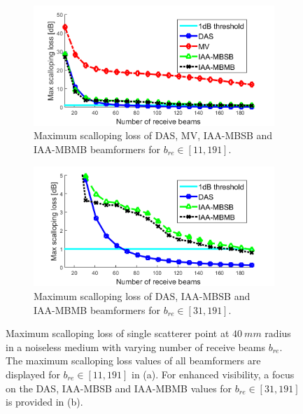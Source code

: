 \begin{figure}[ht]
    \centering
    \begin{subfigure}[t]{\linewidth}
        \includegraphics[width=\linewidth]{./images/results/1/loss_vs_beams.png}
        \caption{Maximum scalloping loss of DAS, MV, IAA-MBSB and IAA-MBMB beamformers for $b_{re} \in [11, 191]$.}
    \end{subfigure}
    \quad
    \begin{subfigure}[t]{\linewidth}
        \includegraphics[width=\linewidth]{./images/results/1/loss_vs_beams_zoom.png}
        \caption{Maximum scalloping loss of DAS, IAA-MBSB and IAA-MBMB beamformers for $b_{re} \in [31, 191]$.}
    \end{subfigure}
	\caption[Maximum scalloping loss of single scatterer point at $40~mm$ radius in a noiseless medium with varying number of receive beams $b_{re}$.]{Maximum scalloping loss of single scatterer point at $40~mm$ radius in a noiseless medium with varying number of receive beams $b_{re}$. The maximum scalloping loss values of all beamformers are displayed for $b_{re} \in [11,191]$ in (a). For enhanced visibility, a focus on the DAS, IAA-MBSB and IAA-MBMB values for $b_{re} \in [31, 191]$ is provided in (b).}
	\label{fig:loss_vs_beams}
\end{figure}

